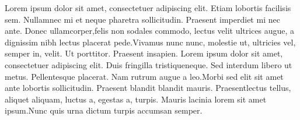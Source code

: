 \documentclass[12pt,stdletter,orderfromtodate,sigleft]{newlfm}
\begin{document}
\begin{newlfm}
Lorem ipsum dolor sit amet, consectetuer adipiscing elit. Etiam lobortis facilisis sem. Nullamnec mi et neque pharetra sollicitudin. Praesent imperdiet mi nec ante. Donec ullamcorper,felis non sodales commodo, lectus velit ultrices augue, a dignissim nibh lectus placerat pede.Vivamus nunc nunc, molestie ut, ultricies vel, semper in, velit. Ut porttitor. Praesent insapien.  Lorem ipsum dolor sit amet, consectetuer adipiscing elit.  Duis fringilla tristiqueneque.  Sed interdum libero ut metus.  Pellentesque placerat.  Nam rutrum augue a leo.Morbi sed elit sit amet ante lobortis sollicitudin. Praesent blandit blandit mauris. Praesentlectus tellus, aliquet aliquam, luctus a, egestas a, turpis. Mauris lacinia lorem sit amet ipsum.Nunc quis urna dictum turpis accumsan semper.
\end{newlfm}
\end{document}
